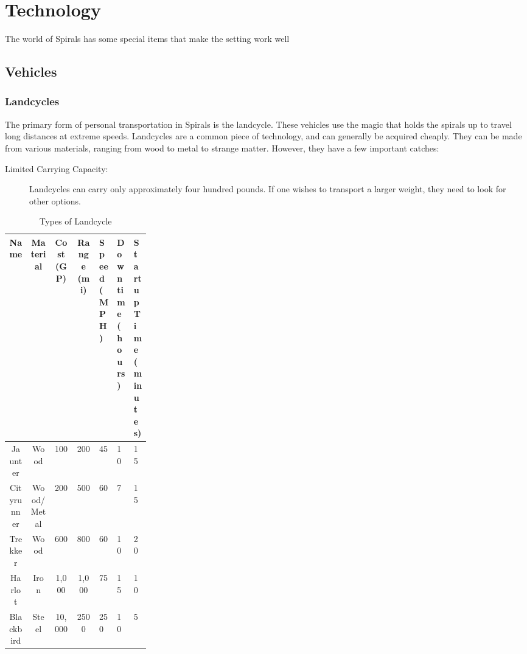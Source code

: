 \chapter{Technology}
The world of Spirals has some special items that make the setting work well 

\section{Vehicles} 
\subsection{Landcycles}
The primary form of personal transportation in Spirals is the landcycle.
These vehicles use the magic that holds the spirals up to travel long distances at extreme speeds.
Landcycles are a common piece of technology, and can generally be acquired cheaply.
They can be made from various materials, ranging from wood to metal to strange matter.
However, they have a few important catches:
\begin{description}
\item[Limited Carrying Capacity:] Landcycles can carry only approximately four hundred pounds.
If one wishes to transport a larger weight, they need to look for other options.
\end{description}


\begin{table}[hb]
\caption{Types of Landcycle}
\begin{center}
\begin{tabular}{|c | c | c | c | p{0.07\linewidth} | p{0.1\linewidth} | p{0.1\linewidth}| }
\hline
Name & Material & Cost (GP) & Range (mi) & Speed (MPH) & Downtime (hours) & Startup Time (minutes) \\
\hline
Jaunter & Wood & 100 & 200 & 45 &10 & 15 \\
\hline
Cityrunner & Wood/Metal & 200 & 500 & 60 & 7 & 15 \\
\hline
Trekker & Wood & 600 & 800 & 60 & 10 & 20 \\
\hline
Harlot & Iron & 1,000 & 1,000 & 75 & 15 & 10 \\
\hline
Blackbird & Steel & 10,000 & 2500 & 250 & 10 & 5 \\
\hline

\end{tabular}
\end{center}
\end{table}

